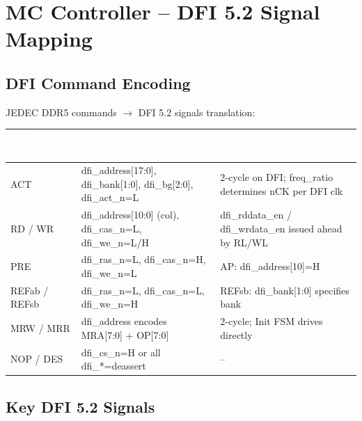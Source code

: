 \documentclass[10pt,a4paper,twoside]{article}
\newcommand{\thd}[1]{\cellcolor{navyblue}\textcolor{white}{\textbf{#1}}}
\newcommand{\trow}{\rowcolor{lightgray}}
\newcommand{\talt}{\rowcolor{skyblue!30}}
\begin{document}
\section{MC Controller -- DFI 5.2 Signal Mapping}

\subsection{DFI Command Encoding}

JEDEC DDR5 commands $\rightarrow$ DFI 5.2 signals translation:

\begin{center}
\begin{tabularx}{\linewidth}{@{} l l X @{}}
\toprule
\thd{DDR5 Command} & \thd{DFI Signal} & \thd{Notes} \\
\midrule
\trow ACT & dfi\_address[17:0], dfi\_bank[1:0], dfi\_bg[2:0], dfi\_act\_n=L & 2-cycle on DFI; freq\_ratio determines nCK per DFI clk \\
\talt RD / WR & dfi\_address[10:0] (col), dfi\_cas\_n=L, dfi\_we\_n=L/H & dfi\_rddata\_en / dfi\_wrdata\_en issued ahead by RL/WL \\
\trow PRE & dfi\_ras\_n=L, dfi\_cas\_n=H, dfi\_we\_n=L & AP: dfi\_address[10]=H \\
\talt REFab / REFsb & dfi\_ras\_n=L, dfi\_cas\_n=L, dfi\_we\_n=H & REFsb: dfi\_bank[1:0] specifies bank \\
\trow MRW / MRR & dfi\_address encodes MRA[7:0] + OP[7:0] & 2-cycle; Init FSM drives directly \\
\talt NOP / DES & dfi\_cs\_n=H or all dfi\_*=deassert & -- \\
\bottomrule
\end{tabularx}
\end{center}

\subsection{Key DFI 5.2 Signals}
\end{document}
